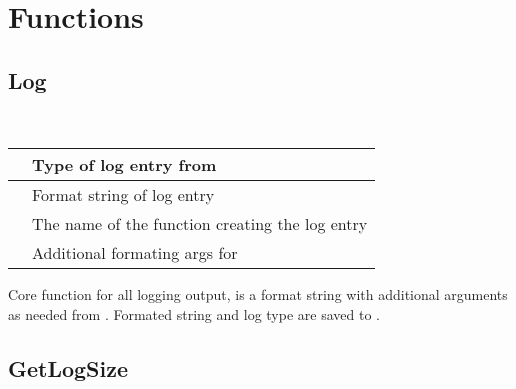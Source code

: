 \documentclass[letterpaper,10pt,english]{sphinxmanual}
\begin{document}
\section{Functions}
\label{\detokenize{log:functions}}

\subsection{Log}
\label{\detokenize{log:log}}

\begin{fulllineitems}
\label{\detokenize{log:_CPPv2N6pessum3LogEiNSt6stringENSt6stringEz}}%
\pysigstartmultiline
{}%
\pysigstopmultiline~

\begin{savenotes}\sphinxattablestart
\centering
\begin{tabulary}{\linewidth}[t]{|T|T|}
\hline

&
Type of log entry from {\hyperref[\detokenize{log:_CPPv2N6pessum7LogTypeE}]{}}
\\
\hline
{}
&
Format string of log entry
\\
\hline
{}
&
The name of the function creating the log entry
\\
\hline
{}
&
Additional formating args for 
\\
\hline
\end{tabulary}
\par
\sphinxattableend\end{savenotes}

Core function for all logging output,  is a format string with
additional arguments as needed from . Formated string and log type
are saved to {\hyperref[\detokenize{log:_CPPv2N6pessum11global_logsE}]{}}.

\end{fulllineitems}



\subsection{GetLogSize}
\label{\detokenize{log:getlogsize}}
\end{document}
